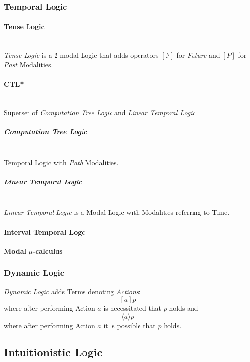 \subsubsection{Temporal Logic}

\paragraph{Tense Logic} \hfill \\

\emph{Tense Logic} is a 2-modal Logic that adds operators $[F]$ for
\emph{Future} and $[P]$ for \emph{Past} Modalities.

\paragraph{CTL*}
\hfill \\
Superset of \emph{Computation Tree Logic} and \emph{Linear
  Temporal Logic}

\subparagraph{Computation Tree Logic}
\hfill \\
Temporal Logic with \emph{Path} Modalities.

\subparagraph{Linear Temporal Logic}\label{sec:linear_temporal}
\hfill \\
\emph{Linear Temporal Logic} is a Modal Logic with Modalities
referring to Time.

\paragraph{Interval Temporal Logc}

\paragraph{Modal $\mu$-calculus}

\subsubsection{Dynamic Logic}

\emph{Dynamic Logic} adds Terms denoting \emph{Actions}:
\[[a]p\]
where after performing Action $a$ is necessitated that $p$ holds and
\[\langle a \rangle p\]
where after performing Action $a$ it is possible that $p$ holds.

\subsection{Intuitionistic Logic}\label{sec:intuitionistic_logic}

